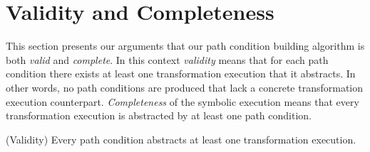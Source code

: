 \section{Validity and Completeness}
\label{subsec:abstraction_relation_validity_completeness}

This section presents our arguments that our path condition building
algorithm is both \emph{valid} and \emph{complete}. In this context
\emph{validity} means that for each path condition there exists at least one
transformation execution that it abstracts.
In other words, no path conditions are produced that lack a concrete
transformation execution counterpart. \emph{Completeness} of the symbolic
execution means that every transformation execution is abstracted by at least
one path condition.

\begin{proposition}{(Validity)}
\label{prop:pc_validity}
Every path condition abstracts at least one transformation execution.
\end{proposition}
